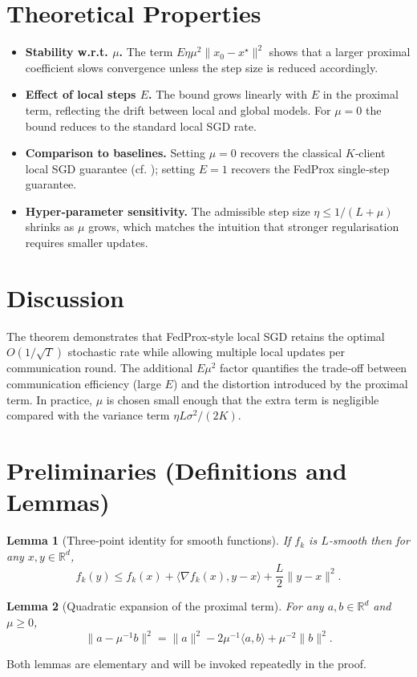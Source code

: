 \documentclass{article}
\newtheorem{lemma}{Lemma}
\newcommand{\R}{\mathbb{R}}
\begin{document}
\section*{Theoretical Properties}
\begin{itemize}[leftmargin=*]
\item \textbf{Stability w.r.t. $\mu$.} The term $E\eta\mu^2\|x_0-x^\star\|^2$ shows that a larger proximal coefficient slows convergence unless the step size is reduced accordingly.
\item \textbf{Effect of local steps $E$.} The bound grows linearly with $E$ in the proximal term, reflecting the drift between local and global models. For $\mu=0$ the bound reduces to the standard local SGD rate.
\item \textbf{Comparison to baselines.} Setting $\mu=0$ recovers the classical $K$‑client local SGD guarantee (cf. \cite{stich2019local}); setting $E=1$ recovers the FedProx single‑step guarantee.
\item \textbf{Hyper‑parameter sensitivity.} The admissible step size $\eta\le1/(L+\mu)$ shrinks as $\mu$ grows, which matches the intuition that stronger regularisation requires smaller updates.
\end{itemize}

\section*{Discussion}
The theorem demonstrates that FedProx‑style local SGD retains the optimal $O(1/\sqrt{T})$ stochastic rate while allowing multiple local updates per communication round. The additional $E\mu^2$ factor quantifies the trade‑off between communication efficiency (large $E$) and the distortion introduced by the proximal term. In practice, $\mu$ is chosen small enough that the extra term is negligible compared with the variance term $\eta L\sigma^2/(2K)$.

\newpage
\section*{Preliminaries (Definitions and Lemmas)}
\begin{lemma}[Three‑point identity for smooth functions]\label{lem:smooth}
If $f_k$ is $L$‑smooth then for any $x,y\in\R^d$,
\[
f_k(y)\le f_k(x)+\langle\nabla f_k(x),y-x\rangle+\frac{L}{2}\|y-x\|^2 .
\tag{2}
\]
\end{lemma}
\begin{lemma}[Quadratic expansion of the proximal term]\label{lem:prox}
For any $a,b\in\R^d$ and $\mu\ge0$,
\[
\|a-\mu^{-1}b\|^2 = \|a\|^2 -2\mu^{-1}\langle a,b\rangle +\mu^{-2}\|b\|^2 .
\tag{3}
\]
\end{lemma}
Both lemmas are elementary and will be invoked repeatedly in the proof.
\end{document}
